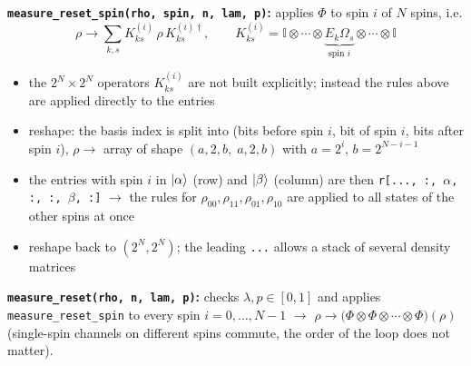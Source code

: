 \textbf{\texttt{measure\_reset\_spin(rho, spin, n, lam, p)}:} applies $\Phi$ to spin $i$ of $N$ spins, i.e.
\begin{equation*}
    \rho \to \sum_{k,s} K_{ks}^{(i)}\, \rho\, K_{ks}^{(i)\dagger}, \qquad
    K_{ks}^{(i)} = \mathbb{I} \otimes \cdots \otimes \underbrace{E_k \Omega_s}_{\text{spin } i} \otimes \cdots \otimes \mathbb{I}
\end{equation*}
\begin{itemize}
    \item the $2^N \times 2^N$ operators $K_{ks}^{(i)}$ are not built explicitly; instead the rules above are
    applied directly to the entries
    \item reshape: the basis index is split into (bits before spin $i$, bit of spin $i$, bits after spin $i$),
    $\rho \to$ array of shape $(a, 2, b,\; a, 2, b)$ with $a = 2^i$, $b = 2^{N-i-1}$
    \item the entries with spin $i$ in $\ket{\alpha}$ (row) and $\ket{\beta}$ (column) are then
    \texttt{r[..., :, $\alpha$, :, :, $\beta$, :]} $\to$ the rules for $\rho_{00}, \rho_{11}, \rho_{01}, \rho_{10}$
    are applied to all states of the other spins at once
    \item reshape back to $(2^N, 2^N)$; the leading \texttt{...} allows a stack of several density matrices
\end{itemize}

\textbf{\texttt{measure\_reset(rho, n, lam, p)}:} checks $\lambda, p \in [0,1]$ and applies
\texttt{measure\_reset\_spin} to every spin $i = 0, \ldots, N-1$
$\to$ $\rho \to \big(\Phi \otimes \Phi \otimes \cdots \otimes \Phi\big)(\rho)$ (single-spin channels on
different spins commute, the order of the loop does not matter).

